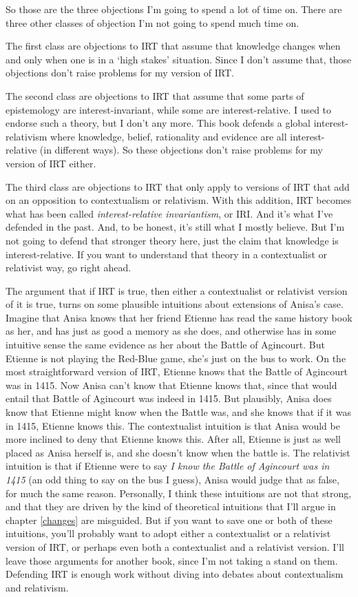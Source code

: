 \documentclass[
  11pt,
]{book}
\begin{document}
So those are the three objections I'm going to spend a lot of time on. There are three other classes of objection I'm not going to spend much time on.

The first class are objections to IRT that assume that knowledge changes when and only when one is in a `high stakes' situation. Since I don't assume that, those objections don't raise problems for my version of IRT.

The second class are objections to IRT that assume that some parts of epistemology are interest-invariant, while some are interest-relative. I used to endorse such a theory, but I don't any more. This book defends a global interest-relativism where knowledge, belief, rationality and evidence are all interest-relative (in different ways). So these objections don't raise problems for my version of IRT either.

The third class are objections to IRT that only apply to versions of IRT that add on an opposition to contextualism or relativism. With this addition, IRT becomes what has been called \emph{interest-relative invariantism}, or IRI. And it's what I've defended in the past. And, to be honest, it's still what I mostly believe. But I'm not going to defend that stronger theory here, just the claim that knowledge is interest-relative. If you want to understand that theory in a contextualist or relativist way, go right ahead.

The argument that if IRT is true, then either a contextualist or relativist version of it is true, turns on some plausible intuitions about extensions of Anisa's case. Imagine that Anisa knows that her friend Etienne has read the same history book as her, and has just as good a memory as she does, and otherwise has in some intuitive sense the same evidence as her about the Battle of Agincourt. But Etienne is not playing the Red-Blue game, she's just on the bus to work. On the most straightforward version of IRT, Etienne knows that the Battle of Agincourt was in 1415. Now Anisa can't know that Etienne knows that, since that would entail that Battle of Agincourt was indeed in 1415. But plausibly, Anisa does know that Etienne might know when the Battle was, and she knows that if it was in 1415, Etienne knows this. The contextualist intuition is that Anisa would be more inclined to deny that Etienne knows this. After all, Etienne is just as well placed as Anisa herself is, and she doesn't know when the battle is. The relativist intuition is that if Etienne were to say \emph{I know the Battle of Agincourt was in 1415} (an odd thing to say on the bus I guess), Anisa would judge that as false, for much the same reason. Personally, I think these intuitions are not that strong, and that they are driven by the kind of theoretical intuitions that I'll argue in chapter \ref{changes} are misguided. But if you want to save one or both of these intuitions, you'll probably want to adopt either a contextualist or a relativist version of IRT, or perhaps even both a contextualist and a relativist version. I'll leave those arguments for another book, since I'm not taking a stand on them. Defending IRT is enough work without diving into debates about contextualism and relativism.
\end{document}
